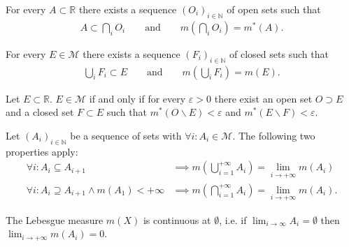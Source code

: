     \begin{property}
        For every $A\subset\mathbb{R}$ there exists a sequence $(O_i)_{i\in\mathbb{N}}$ of open sets such that
        \begin{gather}
            \label{lebesgue:theorem:open_cover_existence}
            A\subset\bigcap_iO_i\qquad\text{and}\qquad m\left(\bigcap_iO_i\right) = m^*(A).
        \end{gather}
    \end{property}
    \begin{property}
        For every $E\in\mathcal{M}$ there exists a sequence $(F_i)_{i\in\mathbb{N}}$ of closed sets such that
        \begin{gather}
            \label{lebesgue:theorem:closed_cover_existence}
            \bigcup_iF_i\subset E\qquad\text{and}\qquad m\left(\bigcup_iF_i\right) = m(E).
        \end{gather}
    \end{property}

    \begin{property}
        Let $E\subset\mathbb{R}$. $E\in\mathcal{M}$ if and only if for every $\varepsilon>0$ there exist an open set $O\supset E$ and a closed set $F\subset E$ such that $m^*(O\backslash E) < \varepsilon$ and $m^*(E\backslash F)<\varepsilon$.
    \end{property}

    \begin{property}
        Let $(A_i)_{i\in\mathbb{N}}$ be a sequence of sets with $\forall i:A_i\in\mathcal{M}$. The following two properties apply:
        \begin{align}
            \forall i: A_i\subseteq A_{i+1} &\implies m\left(\bigcup_{i=1}^{+\infty}A_i\right) = \lim_{i\rightarrow+\infty}m(A_i)\\
            \forall i: A_i\supseteq A_{i+1} \land m(A_1)<+\infty &\implies m\left(\bigcap_{i=1}^{+\infty}A_i\right) = \lim_{i\rightarrow+\infty}m(A_i).
        \end{align}
    \end{property}
    \begin{property}[Continuity]
        The Lebesgue measure $m(X)$ is continuous at $\emptyset$, i.e. if $\lim_{i\rightarrow\infty}A_i=\emptyset$ then $\lim_{i\rightarrow+\infty}m(A_i) = 0$.
    \end{property}

